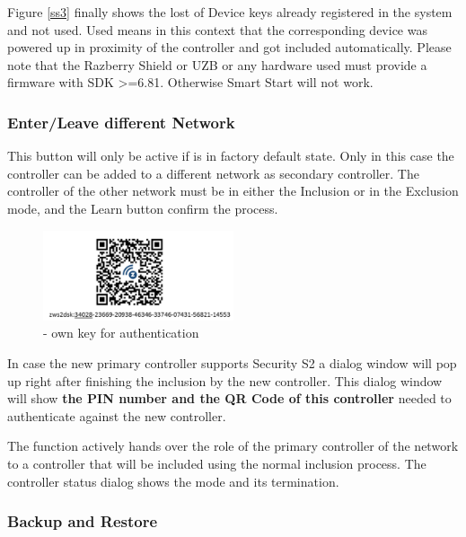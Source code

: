Figure \ref{ss3} finally shows the lost of Device keys already registered 
in the system and not used. Used means in this context that the corresponding device
was powered up in proximity of the controller and got included automatically. Please note that
the Razberry Shield or UZB or any hardware used must provide a firmware with SDK >=6.81. 
Otherwise Smart Start will not work.



\subsubsection{Enter/Leave different Network}


This button will only be active if \zway is in factory default state. Only in this case 
the controller can be added to a different network as secondary controller. The controller 
of the other network must be in either the Inclusion or in the Exclusion mode, and the 
Learn button confirm the process.


\begin{figure}
\begin{center}
\includegraphics[width=0.5\textwidth]{pngs/cap7/security2_5.png}
\caption{\zway -  own key for authentication}
\label{security2_5}
\end{center}
\end{figure}

In case the new primary controller supports Security S2 a dialog window 
will pop up right after finishing the inclusion by the new controller. This dialog window 
will show \textbf{the PIN number and the QR Code of this \zway controller} needed to authenticate 
against the new controller.


The  function actively hands over the role of the primary controller 
of the network to a controller that will be included using the normal inclusion process. 
The controller status dialog shows the mode and its termination.


\subsubsection{Backup and Restore}
\label{BackupandRestore}

